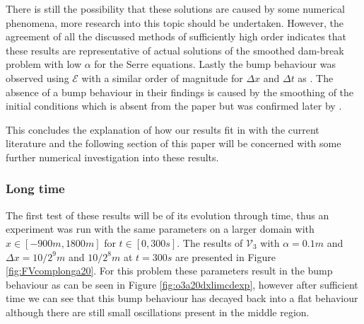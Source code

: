 \documentclass[SingleSpace,12pt,Journal]{Serre_ASCE}
\newcommand\solidrule[1][0.25cm]{\rule[0.5ex]{#1}{1pt}}
\begin{document}

There is still the possibility that these solutions are caused by some numerical phenomena, more research into this topic should be undertaken. However, the agreement of all the discussed methods of sufficiently high order indicates that these results are representative of actual solutions of the smoothed dam-break problem with low $\alpha$ for the Serre equations. Lastly the bump behaviour was observed using $\mathcal{E}$ with a similar order of magnitude for $\Delta x$ and $\Delta t$ as . The absence of a bump behaviour in their findings is caused by the smoothing of the initial conditions which is absent from the paper but was confirmed later by .

This concludes the explanation of how our results fit in with the current literature and the following section of this paper will be concerned with some further numerical investigation into these results. 


\subsubsection{Long time}\label{subsubsec:LT}
The first test of these results will be of its evolution through time, thus an experiment was run with the same parameters on a larger domain with $x \in [-900m, 1800m]$ for $t \in [0,300s]$. The results of $\mathcal{V}_3$ with $\alpha = 0.1m$ and $\Delta x = 10/2^{9}m$ and $10/2^{8}m$  at $t = 300s$ are presented in Figure \ref{fig:FVcomplonga20}. For this problem these parameters result in the bump behaviour as can be seen in Figure \ref{fig:o3a20dxlimcdexp}, however after sufficient time we can see that this bump behaviour has decayed back into a flat behaviour although there are still small oscillations present in the middle region. 
\end{document}
